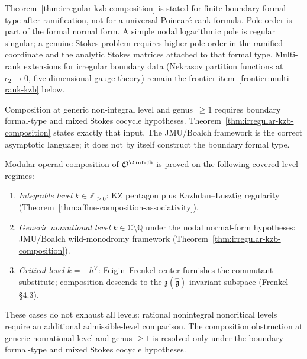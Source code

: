 \begin{remark}
\label{rem:poincare-rank-range}
Theorem~\ref{thm:irregular-kzb-composition} is stated for
finite boundary formal type after ramification, not for a universal
Poincar\'e-rank formula. Pole order is part of the formal normal form.
A simple nodal logarithmic pole is regular singular; a genuine Stokes
problem requires higher pole order in the ramified coordinate and the
analytic Stokes matrices attached to that formal type. Multi-rank
extensions for irregular boundary data (Nekrasov partition functions
at $\epsilon_2 \to 0$, five-dimensional gauge theory) remain the
frontier item~\ref{frontier:multi-rank-kzb} below.
\end{remark}

\begin{remark}
\label{rem:stokes-gap-closed}
Composition at generic non-integral level and genus~\(\ge 1\)
requires boundary formal-type and mixed Stokes cocycle hypotheses.
Theorem~\ref{thm:irregular-kzb-composition} states exactly that
input. The JMU/Boalch framework is the correct
asymptotic language; it does not by itself construct the boundary
formal type.
\end{remark}

\begin{corollary}
\label{cor:fm68-all-levels-resolved}
Modular operad composition of $\mathcal{O}^{\Ainf\text{-ch}}$ is
proved on the following covered level regimes:
\begin{enumerate}[label=\textup{(\alph*)}]
\item \emph{Integrable level} $k \in \mathbb{Z}_{\ge 0}$: KZ
 pentagon plus Kazhdan--Lusztig regularity
 (Theorem~\ref{thm:affine-composition-associativity}).
\item \emph{Generic nonrational level} $k \in \mathbb{C} \setminus
 \mathbb{Q}$ under the nodal normal-form hypotheses: JMU/Boalch
 wild-monodromy framework
 (Theorem~\ref{thm:irregular-kzb-composition}).
\item \emph{Critical level} $k = -h^\vee$: Feigin--Frenkel center
 furnishes the commutant substitute; composition descends to
 the $\mathfrak{z}(\hat{\mathfrak{g}})$-invariant subspace
 (Frenkel~\cite{FrenkelLanglands} \S 4.3).
\end{enumerate}
These cases do not exhaust all levels: rational nonintegral
noncritical levels require an additional admissible-level comparison.
The composition obstruction at generic nonrational level and
genus $\ge 1$ is resolved only under the boundary formal-type and
mixed Stokes cocycle hypotheses.
\end{corollary}

